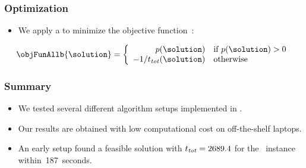 \documentclass[aspectratio=169,mathserif,notheorems]{beamer}%
\begin{document}
%
\begin{frame}%
\frametitle{Optimization}%
\begin{itemize}%
\item We apply a  to minimize the objective function~\objFunAll:%
\end{itemize}%
%
\begin{equation}%
\objFunAllb{\solution}=\left\{%
\begin{array}{rl}%
\fpenaltyb{\solution}&\text{if }\fpenaltyb{\solution}>0\\%
-1/\timeTotalb{\solution}&\text{otherwise}%
\end{array}%
\right.\label{eq:fAll}%
\end{equation}%
%
%
\end{frame}%
%
\begin{frame}%
\frametitle{Summary}%
\begin{itemize}%
%
\item We tested several different algorithm setups implemented in \moptipy\cite{WW2023RSDEWASSAA}.%
%
\item<2-> Our results are obtained with low computational cost on off-the-shelf laptops.%
%
\item<3-> An early setup found a feasible solution with $t_{\mathit{tot}}=2689.4$ for the \instL\ instance within~187~seconds.%
%
\end{itemize}%
\end{frame}%
%
%
%
\endPresentation%
\end{document}
